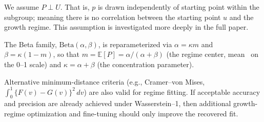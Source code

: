 \documentclass[10pt]{article}
\newlength{\fnlabelwidth}
\newcommand{\fnline}[2]{%
  \par\noindent
  \makebox[\fnlabelwidth][l]{$^{#1}$}%
  \parbox[t]{\dimexpr\linewidth-\fnlabelwidth\relax}{#2}%
  \par
}
\begin{document}
\begin{minipage}[t]{15.2in}
\vspace{4pt}
\fnline{5}{We assume $P\perp U$. That is, $p$ is drawn independently of starting point within the subgroup; meaning there is no correlation between the starting point $u$ and the growth regime. This assumption is investigated more deeply in the full paper.}

\vspace{4pt}
\fnline{6}{The Beta family, $\mathrm{Beta}(\alpha, \beta)$, is reparameterized via $\alpha = \kappa m$ and $\beta = \kappa(1-m)$, so that $m = \mathbb{E}[P] = \alpha / (\alpha + \beta)$ (the regime center, mean \SGPc~on the 0--1 scale) and $\kappa = \alpha + \beta$ (the concentration parameter).}

\vspace{4pt}
\fnline{7}{Alternative minimum-distance criteria (e.g., Cramer--von Mises, $\int_0^1 \{F(v)-G(v)\}^2\,dv$) are also valid for regime fitting. If acceptable accuracy and precision are already achieved under Wasserstein--1, then additional growth-regime optimization and fine-tuning should only improve the recovered fit.}

\end{minipage}
\end{document}
